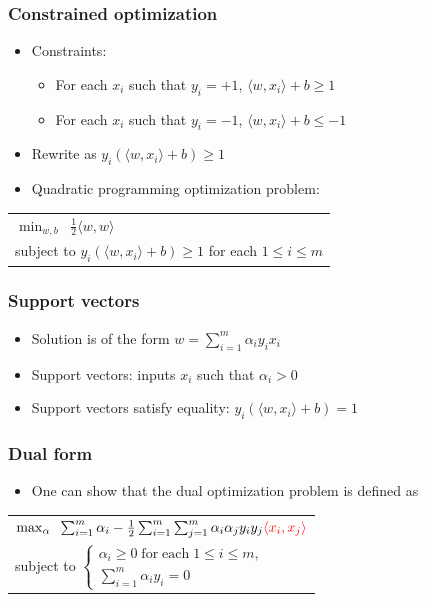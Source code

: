 \documentclass[10pt]{beamer}
\begin{document}
\begin{frame}
  \frametitle{Constrained optimization}
  \begin{itemize}
    \item Constraints:
  \begin{itemize}
    \item For each $x_i$ such that $y_i=+1$, $\langle w,x_i\rangle+b\geq 1$
    \item For each $x_i$ such that $y_i=-1$, $\langle w,x_i\rangle+b\leq-1$
  \end{itemize}
    \item Rewrite as $y_i(\langle w,x_i\rangle+b)\geq 1$
	\pause
    \item Quadratic programming optimization problem:
  \end{itemize}
	\vspace{.1cm}
  \begin{tabular}{l}
	\vspace{.2cm}
    \hspace*{1cm}$\min_{w,b} \;\; \frac{1}{2}\langle w,w\rangle$\\
	\hspace*{1cm}subject to $y_i(\langle w,x_i\rangle+b)\geq 1$ for each $1\leq i\leq m$
  \end{tabular}
\end{frame}

\begin{frame}
  \frametitle{Support vectors}
  \begin{itemize}
    \item Solution is of the form $w=\sum_{i=1}^m\alpha_iy_ix_i$
	\item {\color{red} Support vectors}: inputs $x_i$ such that $\alpha_i>0$ 
	\item Support vectors satisfy {\color{blue} equality}: $y_i(\langle w,x_i\rangle+b)=1$
  \end{itemize}
\end{frame}

\begin{frame}
  \frametitle{Dual form}
  \begin{itemize}
	\item One can show that the dual optimization problem is defined as
  \end{itemize}
  \begin{tabular}{l}
	\vspace{.2cm}
    \hspace*{1cm}$\max_\alpha \;\; \sum_{i=1}^m\alpha_i-\frac{1}{2}\sum_{i=1}^m\sum_{j=1}^m\alpha_i\alpha_jy_iy_j {\color{red} \langle x_i,x_j\rangle}$\\
	\hspace*{1cm}subject to $\left\{\begin{array}{l}\alpha_i\geq 0\;\mathrm{for}\;\mathrm{each}\;1\leq i\leq m,\\\sum_{i=1}^m\alpha_iy_i=0\end{array}\right.$
  \end{tabular}
\end{frame}
\end{document}
